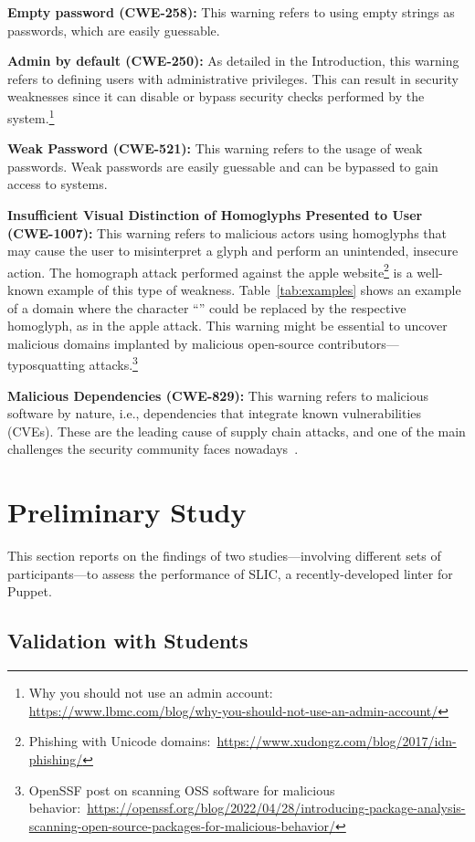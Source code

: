 \textbf{Empty password (CWE-258):} This warning refers to using
empty strings as passwords, which are easily
guessable.

\textbf{Admin by default (CWE-250):} As detailed in the Introduction, this warning refers to
defining users with administrative privileges. This can result in security
weaknesses since it can disable or bypass security checks performed by the system.\footnote{Why
you should not use an admin account: \url{https://www.lbmc.com/blog/why-you-should-not-use-an-admin-account/}}

\textbf{Weak Password (CWE-521):}
This warning refers to the usage of weak passwords. Weak passwords
are easily guessable and can be bypassed to gain access to systems.

\textbf{Insufficient Visual Distinction of Homoglyphs Presented to User (CWE-1007):}
This warning refers to malicious actors using homoglyphs
that may cause the user to misinterpret a glyph and perform an unintended, insecure action.
The homograph attack performed against the apple website\footnote{Phishing
with Unicode domains:~\url{https://www.xudongz.com/blog/2017/idn-phishing/}} is a well-known
example of this type of weakness. Table~\ref{tab:examples} shows an example of a domain where 
the character ``'' could be replaced by the respective homoglyph, as in the apple attack.
This warning might be essential to uncover malicious domains implanted by malicious open-source
contributors---typosquatting attacks.\footnote{OpenSSF post on scanning OSS software for malicious behavior:~\url{https://openssf.org/blog/2022/04/28/introducing-package-analysis-scanning-open-source-packages-for-malicious-behavior/}}

\textbf{Malicious Dependencies (CWE-829):} This warning refers to malicious software
by nature, i.e., dependencies that integrate known vulnerabilities (CVEs).
These are the leading cause of supply chain attacks, and one of the main
challenges the security community faces nowadays~\cite{9402108}. 

\section{Preliminary Study}\label{sec:preliminary_study}

This section reports on the findings of two studies---involving
different sets of participants---to assess the performance of SLIC, 
a recently-developed linter for Puppet.


\subsection{Validation with Students}\label{sec:research_team}

